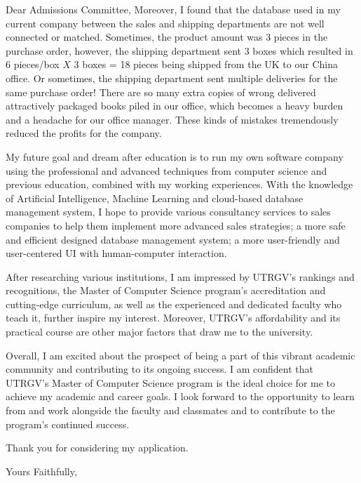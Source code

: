 \documentclass{letter}
\begin{document}
\begin{letter}{Dear Admissions Committee,}
Moreover, I found that the database used in my current company between the sales and shipping departments are not well connected or matched. Sometimes, the product amount was 3 pieces in the purchase order, however, the shipping department sent 3 boxes which resulted in 6 pieces/box $X$ 3 boxes = 18 pieces being shipped from the UK to our China office. Or sometimes, the shipping department sent multiple deliveries for the same purchase order! There are so many extra copies of wrong delivered attractively packaged books piled in our office, which becomes a heavy burden and a headache for our office manager. These kinds of mistakes tremendously reduced the profits for the company.


My future goal and dream after education is to run my own software company using the professional and advanced techniques from computer science and previous education, combined with my working experiences.  With the knowledge of Artificial Intelligence, Machine Learning and cloud-based database management system, I hope to provide various consultancy services to sales companies  to help them implement more advanced sales strategies; a more safe and efficient designed database management system; a more user-friendly and user-centered UI with human-computer interaction.



After researching various institutions, I am impressed by UTRGV's rankings and recognitions, the Master of Computer Science program's accreditation and cutting-edge curriculum, as well as the experienced and dedicated faculty who teach it, further inspire my interest. Moreover, UTRGV's affordability and its practical course are other major factors that draw me to the university. %



Overall, I am excited about the prospect of being a part of this vibrant academic community and contributing to its ongoing success. I am confident that UTRGV's Master of Computer Science program is the ideal choice for me to achieve my academic and career goals. I look forward to the opportunity to learn from and work alongside the faculty and classmates and to contribute to the program's continued success. 

Thank you for considering my application.




















\closing{Yours Faithfully,}

\end{letter}
\end{document}

